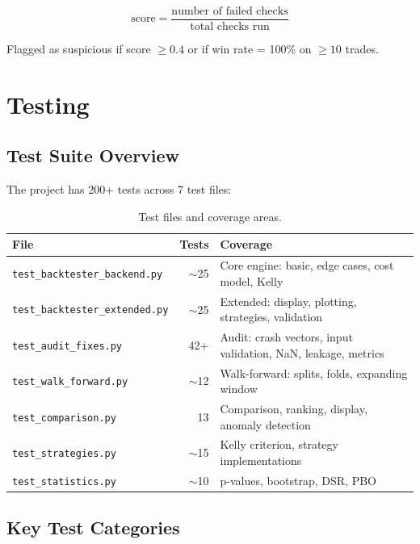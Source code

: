 \documentclass[12pt,a4paper]{report}
\theoremstyle{definition}
\newcommand{\file}[1]{\texttt{#1}}
\begin{document}
\begin{equation}
    \text{score} = \frac{\text{number of failed checks}}{\text{total checks run}}
\end{equation}

Flagged as suspicious if score $\geq 0.4$ or if win rate = 100\% on $\geq 10$ trades.


\chapter{Testing}
\label{ch:testing}

\section{Test Suite Overview}

The project has 200+ tests across 7 test files:

\begin{table}[H]
\centering
\caption{Test files and coverage areas.}
\label{tab:test-files}
\begin{tabularx}{\textwidth}{lrX}
\toprule
\textbf{File} & \textbf{Tests} & \textbf{Coverage} \\
\midrule
\file{test\_backtester\_backend.py}     & $\sim$25 & Core engine: basic, edge cases, cost model, Kelly \\
\file{test\_backtester\_extended.py}    & $\sim$25 & Extended: display, plotting, strategies, validation \\
\file{test\_audit\_fixes.py}           & 42+ & Audit: crash vectors, input validation, NaN, leakage, metrics \\
\file{test\_walk\_forward.py}          & $\sim$12 & Walk-forward: splits, folds, expanding window \\
\file{test\_comparison.py}             & 13  & Comparison, ranking, display, anomaly detection \\
\file{test\_strategies.py}             & $\sim$15 & Kelly criterion, strategy implementations \\
\file{test\_statistics.py}             & $\sim$10 & p-values, bootstrap, DSR, PBO \\
\bottomrule
\end{tabularx}
\end{table}

\section{Key Test Categories}
\end{document}
